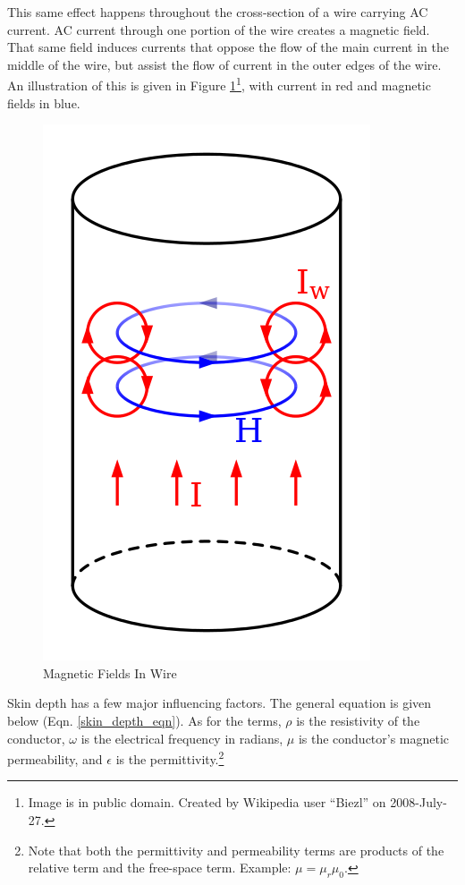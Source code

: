 This same effect happens throughout the cross-section of a wire carrying AC current. AC current through one portion of the wire creates a magnetic field. That same field induces currents that oppose the flow of the main current in the middle of the wire, but assist the flow of current in the outer edges of the wire. An illustration of this is given in Figure \ref{skin_fields}\footnote{Image is in public domain. Created by Wikipedia user ``Biezl'' on 2008-July-27.}, with current in red and magnetic fields in blue.

\begin{figure}[h]
\centering
\includegraphics[scale=0.35]{skin_effect_fields.png}
\caption{Magnetic Fields In Wire}\label{skin_fields}
\end{figure}

Skin depth has a few major influencing factors. The general equation is given below (Eqn. \ref{skin_depth_eqn}). As for the terms, $\rho$ is the resistivity of the conductor, $\omega$ is the electrical frequency in radians, $\mu$ is the conductor's magnetic permeability, and $\epsilon$ is the permittivity.\footnote{Note that both the permittivity and permeability terms are products of the relative term and the free-space term. Example: $\mu = \mu_r \mu_0$.}

